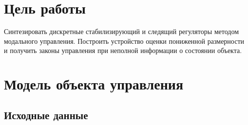 
\setlength{\abovedisplayskip}{7pt}
\setlength{\belowdisplayskip}{7pt}
\setlength{\abovedisplayshortskip}{4pt}
\setlength{\belowdisplayshortskip}{4pt}

\makeatletter
\newenvironment{reportfigure}{%
  \par\addvspace{8pt}\noindent
  \begin{minipage}{\textwidth}
    \def\@captype{figure}%
    \centering
}{%
  \end{minipage}\par\vspace{4pt}
}
\makeatother

\tableofcontents
\newpage

\section{Цель работы}

Синтезировать дискретные стабилизирующий и следящий регуляторы
методом модального управления. Построить устройство оценки
пониженной размерности и получить законы управления при неполной
информации о состоянии объекта.

\section{Модель объекта управления}

\subsection{Исходные данные}

